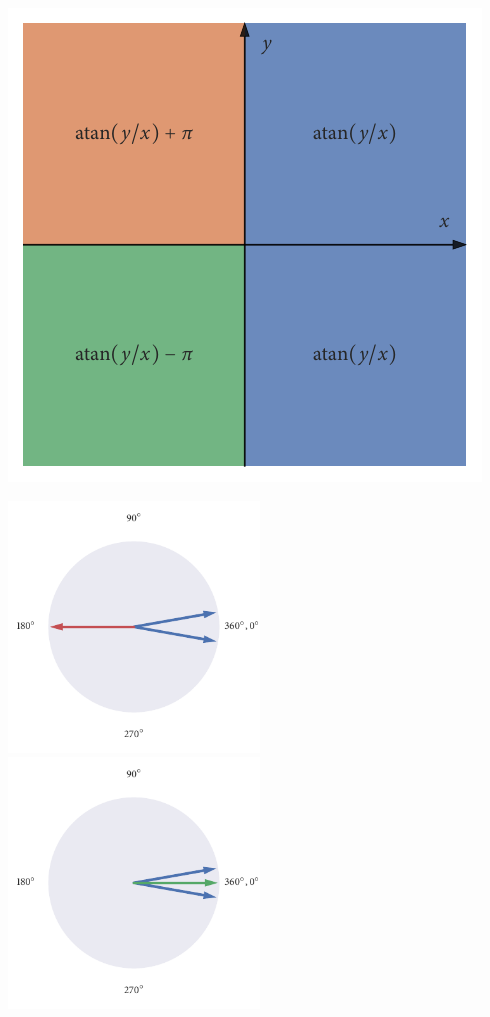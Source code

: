 \documentclass[12pt]{beamer}
\begin{document}
\begin{frame}
  \vspace{0.85cm}
  \centering
  \includegraphics{atan_quadrants.pdf}
\end{frame}

\begin{frame}
  \vspace{0.85cm}
  \centering
  \includegraphics[width=0.5\textwidth]{arith_mean.pdf}%
  \includegraphics[width=0.5\textwidth]{circ_mean.pdf}
\end{frame}
\end{document}
